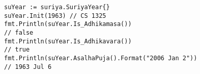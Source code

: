 \documentclass[10pt]{article}
\begin{document}
\begin{verbatim}
suYear := suriya.SuriyaYear{}
suYear.Init(1963) // CS 1325
fmt.Println(suYear.Is_Adhikamasa())
// false
fmt.Println(suYear.Is_Adhikavara())
// true
fmt.Println(suYear.AsalhaPuja().Format("2006 Jan 2"))
// 1963 Jul 6
\end{verbatim}
\end{document}

